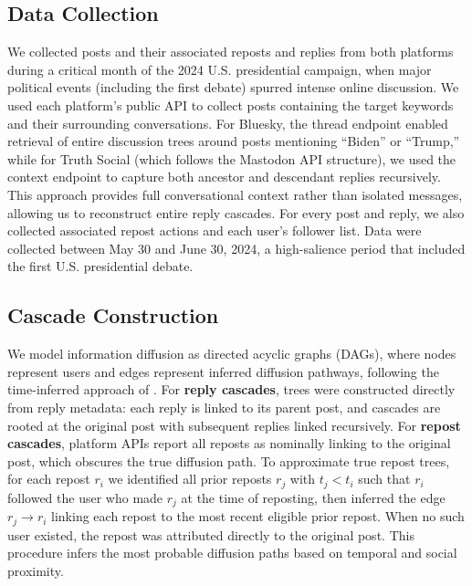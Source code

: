 \documentclass[letterpaper]{article} %
\begin{document}
\subsection{Data Collection}
We collected posts and their associated reposts and replies from both platforms during a critical month of the 2024 U.S. presidential campaign, when major political events (including the first debate) spurred intense online discussion. We used each platform's public API to collect posts containing the target keywords and their surrounding conversations. For Bluesky, the thread endpoint enabled retrieval of entire discussion trees around posts mentioning ``Biden'' or ``Trump,'' while for Truth Social (which follows the Mastodon API structure), we used the context endpoint to capture both ancestor and descendant replies recursively. This approach provides full conversational context rather than isolated messages, allowing us to reconstruct entire reply cascades. For every post and reply, we also collected associated repost actions and each user's follower list. Data were collected between May 30 and June 30, 2024, a high-salience period that included the first U.S. presidential debate.

\subsection{Cascade Construction}
We model information diffusion as directed acyclic graphs (DAGs), where nodes represent users and edges represent inferred diffusion pathways, following the time-inferred approach of \citet{vosoughi_spread_2018}. For \textbf{reply cascades}, trees were constructed directly from reply metadata: each reply is linked to its parent post, and cascades are rooted at the original post with subsequent replies linked recursively. For \textbf{repost cascades}, platform APIs report all reposts as nominally linking to the original post, which obscures the true diffusion path. To approximate true repost trees, for each repost $r_i$ we identified all prior reposts $r_j$ with $t_j < t_i$ such that $r_i$ followed the user who made $r_j$ at the time of reposting, then inferred the edge $r_j \rightarrow r_i$ linking each repost to the most recent eligible prior repost. When no such user existed, the repost was attributed directly to the original post. This procedure infers the most probable diffusion paths based on temporal and social proximity.
\end{document}
